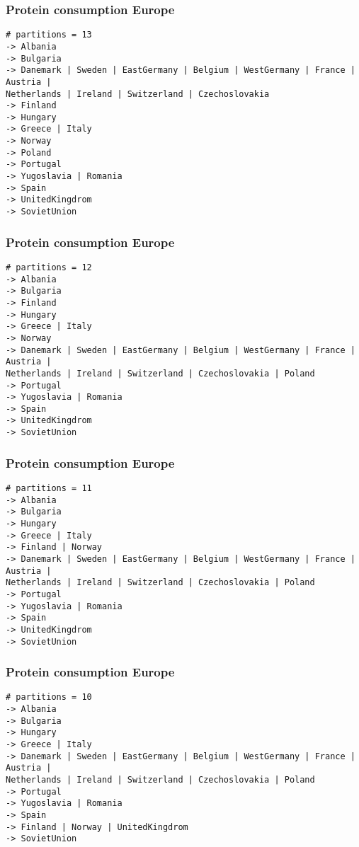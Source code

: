 \begin{frame}[fragile, t]
\frametitle{Protein consumption Europe \hyperlink{last-aliments<1>}{}}
\scriptsize
\begin{verbatim}
# partitions = 13
-> Albania
-> Bulgaria
-> Danemark | Sweden | EastGermany | Belgium | WestGermany | France | Austria | 
Netherlands | Ireland | Switzerland | Czechoslovakia
-> Finland
-> Hungary
-> Greece | Italy
-> Norway
-> Poland
-> Portugal
-> Yugoslavia | Romania
-> Spain
-> UnitedKingdrom
-> SovietUnion
\end{verbatim}

\end{frame}
\begin{frame}[fragile, t]
\frametitle{Protein consumption Europe \hyperlink{last-aliments<1>}{}}
\scriptsize
\begin{verbatim}
# partitions = 12
-> Albania
-> Bulgaria
-> Finland
-> Hungary
-> Greece | Italy
-> Norway
-> Danemark | Sweden | EastGermany | Belgium | WestGermany | France | Austria | 
Netherlands | Ireland | Switzerland | Czechoslovakia | Poland
-> Portugal
-> Yugoslavia | Romania
-> Spain
-> UnitedKingdrom
-> SovietUnion
\end{verbatim}

\end{frame}
\begin{frame}[fragile, t]
\frametitle{Protein consumption Europe \hyperlink{last-aliments<1>}{}}
\scriptsize
\begin{verbatim}
# partitions = 11
-> Albania
-> Bulgaria
-> Hungary
-> Greece | Italy
-> Finland | Norway
-> Danemark | Sweden | EastGermany | Belgium | WestGermany | France | Austria | 
Netherlands | Ireland | Switzerland | Czechoslovakia | Poland
-> Portugal
-> Yugoslavia | Romania
-> Spain
-> UnitedKingdrom
-> SovietUnion
\end{verbatim}

\end{frame}
\begin{frame}[fragile, t]
\frametitle{Protein consumption Europe \hyperlink{last-aliments<1>}{}}
\scriptsize
\begin{verbatim}
# partitions = 10
-> Albania
-> Bulgaria
-> Hungary
-> Greece | Italy
-> Danemark | Sweden | EastGermany | Belgium | WestGermany | France | Austria | 
Netherlands | Ireland | Switzerland | Czechoslovakia | Poland
-> Portugal
-> Yugoslavia | Romania
-> Spain
-> Finland | Norway | UnitedKingdrom
-> SovietUnion
\end{verbatim}

\end{frame}
